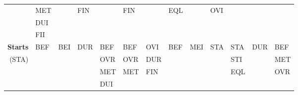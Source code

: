 \documentclass[11pt]{report}
\newenvironment{vvarmargin}[2]
{
  \begin{list}{}
  {
    \setlength{\topsep}{0pt}
    \setlength{\leftmargin}{0pt}
    \setlength{\rightmargin}{0pt}
    \setlength{\listparindent}{\parindent}
    \setlength{\itemindent}{\parindent}
    \setlength{\parsep}{0pt plus 1pt}
    \addtolength{\leftmargin}{#1}\addtolength{\rightmargin}{#2}
  }
  \item
}
{
  \end{list}
}
\begin{document}
\begin{table}[p]
\begin{vvarmargin}{-4cm}{-4cm}
\begin{center}
\begin{tabular}[t]{|r|l|l|l|l|l|l|l|l|l|l|l|l|}
                                        & MET                     &                         & FIN                     &                         & FIN                     &                         & EQL                     &                         & OVI                     &                         &                         &                         \\
                                        & DUI                     &                         &                         &                         &                         &                         &                         &                         &                         &                         &                         &                         \\
                                        & FII                     &                         &                         &                         &                         &                         &                         &                         &                         &                         &                         &                         \\
                \hline
                \textbf{Starts}         & BEF                     & BEI                     & DUR                     & BEF                     & BEF                     & OVI                     & BEF                     & MEI                     & STA                     & STA                     & DUR                     & BEF                     \\
                (STA)                   &                         &                         &                         & OVR                     & OVR                     & DUR                     &                         &                         &                         & STI                     &                         & MET                     \\
                                        &                         &                         &                         & MET                     & MET                     & FIN                     &                         &                         &                         & EQL                     &                         & OVR                     \\
                                        &                         &                         &                         & DUI                     &                         &                         &                         &                         &                         &                         &                         &                         \\

\end{tabular}
\end{center}
\end{vvarmargin}
\end{table}
\end{document}
